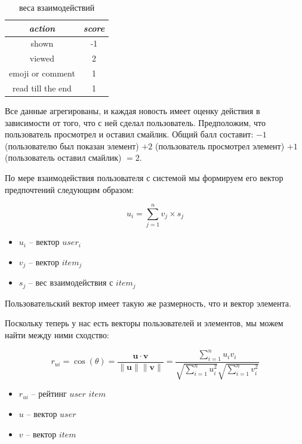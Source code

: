 \documentclass[14pt]{matmex-diploma-custom}
\begin{document}
\begin{table}[h]
    \centering
    \begin{tabular}{cc}
        \toprule
        \textit{action} & \textit{score} \\
        \midrule
        shown & -1 \\
        viewed & 2 \\
        emoji or comment & 1 \\
        read till the end & 1 \\
        \bottomrule
    \end{tabular}%
    \caption{веса взаимодействий}
    \label{tab:action_score}
\end{table}

Все данные агрегированы, и каждая новость имеет оценку действия в зависимости от того, что с ней сделал пользователь. Предположим, что пользователь просмотрел и оставил смайлик. Общий балл составит: $ -1 $ (пользователю был показан элемент) $ + 2 $ (пользователь просмотрел элемент) $ + 1 $ (пользователь оставил смайлик) $ = 2 $.

По мере взаимодействия пользователя с системой мы формируем его вектор предпочтений следующим образом:

\begin{equation}
    u_i = \sum_{j=1}^{n} v_j \times s_j
\end{equation}

\begin{itemize}
    \item $u_i$ -- вектор $user_i$
    \item $v_j$ -- вектор $item_j$
    \item $s_j$ -- вес взаимодействия с $item_j$
\end{itemize}

Пользовательский вектор имеет такую же размерность, что и вектор элемента.

Поскольку теперь у нас есть векторы пользователей и элементов, мы можем найти между ними сходство:


\begin{equation}
    r_{ui}=\cos (\theta)=\frac{\mathbf{u} \cdot \mathbf{v}}{\|\mathbf{u}\|\|\mathbf{v}\|}=\frac{\sum_{i=1}^{n} u_{i} v_{i}}{\sqrt{\sum_{i=1}^{n} u_{i}^{2}} \sqrt{\sum_{i=1}^{n} v_{i}^{2}}}
\end{equation}

\begin{itemize}
    \item $r_{ui}$ -- рейтинг $user$ $item$
    \item $u$ -- вектор $user$
    \item $v$ -- вектор $item$
\end{itemize}
\end{document}
